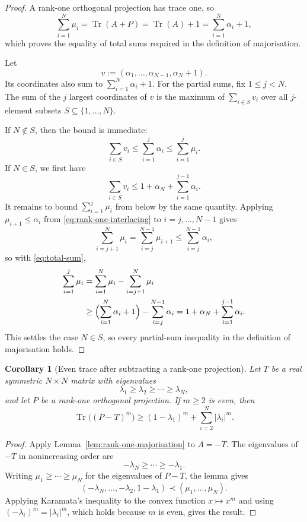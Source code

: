 \documentclass[11pt]{article}
\newtheorem{corollary}[theorem]{Corollary}
\theoremstyle{definition}
\theoremstyle{remark}
\newcommand{\tr}{\operatorname{Tr}}
\begin{document}
\begin{proof}
  A rank-one orthogonal projection has trace one, so
  \begin{equation}
    \sum_{i=1}^N\mu_i=\tr(A+P)=\tr(A)+1=\sum_{i=1}^N\alpha_i+1,
    \label{eq:total-sum}
  \end{equation}
  which proves the equality of total sums required in the definition of
  majorisation.

  Let
  \[
    v:=(\alpha_1,\ldots,\alpha_{N-1},\alpha_N+1).
  \]
  Its coordinates also sum to $\sum_{i=1}^N\alpha_i+1$.  For the partial
  sums, fix $1\le j<N$.  The sum of the $j$ largest coordinates of $v$ is
  the maximum of $\sum_{i\in S}v_i$ over all $j$-element subsets
  $S\subseteq\{1,\ldots,N\}$.

  If $N\notin S$, then the bound is immediate:
  \[
    \sum_{i\in S}v_i
    \le\sum_{i=1}^j\alpha_i
    \le\sum_{i=1}^j\mu_i.
  \]
  If $N\in S$, we first have
  \[
    \sum_{i\in S}v_i
    \le1+\alpha_N+\sum_{i=1}^{j-1}\alpha_i.
  \]
  It remains to bound $\sum_{i=1}^j\mu_i$ from below by the same quantity.
  Applying $\mu_{i+1}\le\alpha_i$ from \eqref{eq:rank-one-interlacing} to
  $i=j,\ldots,N-1$ gives
  \[
    \sum_{i=j+1}^N\mu_i
    =\sum_{i=j}^{N-1}\mu_{i+1}
    \le\sum_{i=j}^{N-1}\alpha_i,
  \]
  so with \eqref{eq:total-sum},
  \begin{align*}
    \sum_{i=1}^j\mu_i
    &=\sum_{i=1}^N\mu_i-\sum_{i=j+1}^N\mu_i\\
    &\ge\Bigl(\sum_{i=1}^N\alpha_i+1\Bigr)-\sum_{i=j}^{N-1}\alpha_i
    =1+\alpha_N+\sum_{i=1}^{j-1}\alpha_i.
  \end{align*}
  This settles the case $N\in S$, so every partial-sum inequality in the
  definition of majorisation holds.
\end{proof}

\begin{corollary}[Even trace after subtracting a rank-one projection]
  \label{cor:rank-one-trace}
  Let $T$ be a real symmetric $N\times N$ matrix with eigenvalues
  \[
    \lambda_1\ge\lambda_2\ge\cdots\ge\lambda_N,
  \]
  and let $P$ be a rank-one orthogonal projection.  If $m\ge2$ is even, then
  \[
    \tr\bigl((P-T)^m\bigr)
    \ge
    (1-\lambda_1)^m+
    \sum_{i=2}^N|\lambda_i|^m.
  \]
\end{corollary}

\begin{proof}
  Apply Lemma~\ref{lem:rank-one-majorisation} to $A=-T$.  The eigenvalues of
  $-T$ in nonincreasing order are
  \[
    -\lambda_N\ge\cdots\ge-\lambda_1.
  \]
  Writing $\mu_1\ge\cdots\ge\mu_N$ for the eigenvalues of $P-T$, the lemma
  gives
  \[
    (-\lambda_N,\ldots,-\lambda_2,1-\lambda_1)
    \prec(\mu_1,\ldots,\mu_N).
  \]
  Applying Karamata's inequality to the convex function $x\mapsto x^m$ and
  using $(-\lambda_i)^m=|\lambda_i|^m$, which holds because $m$ is even,
  gives the result.
\end{proof}
\end{document}
